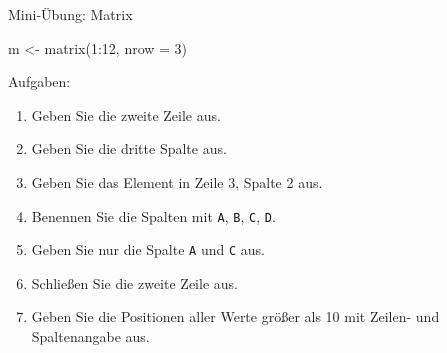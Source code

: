 \documentclass[
  10pt,
  ignorenonframetext,
  aspectratio=169,
]{beamer}
\newenvironment{Shaded}{}{}
\newcommand{\AttributeTok}[1]{\textcolor[rgb]{0.49,0.56,0.16}{#1}}
\newcommand{\DecValTok}[1]{\textcolor[rgb]{0.25,0.63,0.44}{#1}}
\newcommand{\FunctionTok}[1]{\textcolor[rgb]{0.02,0.16,0.49}{#1}}
\newcommand{\NormalTok}[1]{#1}
\newcommand{\OtherTok}[1]{\textcolor[rgb]{0.00,0.44,0.13}{#1}}
\newcommand{\SpecialCharTok}[1]{\textcolor[rgb]{0.25,0.44,0.63}{#1}}
\providecommand{\tightlist}{%
  \setlength{\itemsep}{0pt}\setlength{\parskip}{0pt}}
\begin{document}
\begin{frame}[fragile]{Mini-Übung: Matrix}
\label{mini-uxfcbung-matrix}
\begin{Shaded}
\begin{Highlighting}[]
\NormalTok{m }\OtherTok{\textless{}{-}} \FunctionTok{matrix}\NormalTok{(}\DecValTok{1}\SpecialCharTok{:}\DecValTok{12}\NormalTok{, }\AttributeTok{nrow =} \DecValTok{3}\NormalTok{)}
\end{Highlighting}
\end{Shaded}

Aufgaben:

\begin{enumerate}
\tightlist
\item
  Geben Sie die zweite Zeile aus.
\item
  Geben Sie die dritte Spalte aus.
\item
  Geben Sie das Element in Zeile 3, Spalte 2 aus.
\item
  Benennen Sie die Spalten mit \texttt{A}, \texttt{B}, \texttt{C},
  \texttt{D}.
\item
  Geben Sie nur die Spalte \texttt{A} und \texttt{C} aus.
\item
  Schließen Sie die zweite Zeile aus.
\item
  Geben Sie die Positionen aller Werte größer als 10 mit Zeilen- und
  Spaltenangabe aus.
\end{enumerate}
\end{frame}
\end{document}
